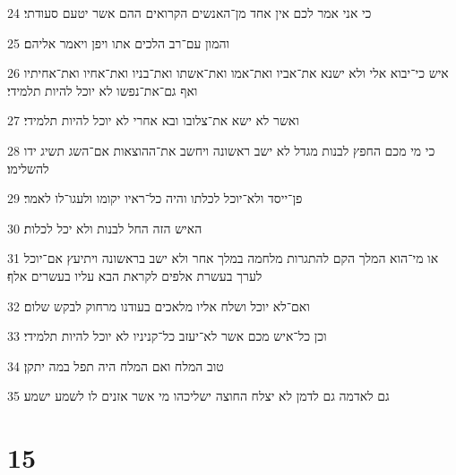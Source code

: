 \par 24 כי אני אמר לכם אין אחד מן־האנשים הקרואים ההם אשר יטעם סעודתי׃
\par 25 והמון עם־רב הלכים אתו ויפן ויאמר אליהם׃
\par 26 איש כי־יבוא אלי ולא ישנא את־אביו ואת־אמו ואת־אשתו ואת־בניו ואת־אחיו ואת־אחיתיו ואף גם־את־נפשו לא יוכל להיות תלמידי׃
\par 27 ואשר לא ישא את־צלובו ובא אחרי לא יוכל להיות תלמידי׃
\par 28 כי מי מכם החפץ לבנות מגדל לא ישב ראשונה ויחשב את־ההוצאות אם־השג תשיג ידו להשלימו׃
\par 29 פן־ייסד ולא־יוכל לכלתו והיה כל־ראיו יקומו ולעגו־לו לאמר׃
\par 30 האיש הזה החל לבנות ולא יכל לכלות׃
\par 31 או מי־הוא המלך הקם להתגרות מלחמה במלך אחר ולא ישב בראשונה ויתיעץ אם־יוכל לערך בעשרת אלפים לקראת הבא עליו בעשרים אלף׃
\par 32 ואם־לא יוכל ושלח אליו מלאכים בעודנו מרחוק לבקש שלום׃
\par 33 וכן כל־איש מכם אשר לא־יעזב כל־קניניו לא יוכל להיות תלמידי׃
\par 34 טוב המלח ואם המלח היה תפל במה יתקן׃
\par 35 גם לאדמה גם לדמן לא יצלח החוצה ישליכהו מי אשר אזנים לו לשמע ישמע׃

\chapter{15}

